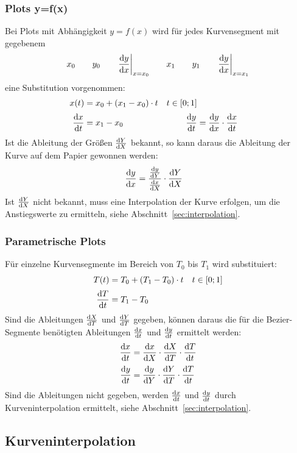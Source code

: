 \documentclass[ngerman,origlongtable]{scrartcl}
\begin{document}
\subsubsection{Plots y=f(x)}
Bei Plots mit Abhängigkeit \(y=f(x)\) wird für jedes Kurvensegment
mit gegebenem
\[
x_0\qquad{}y_0\qquad{\left.\frac{\mathrm{d}y}{\mathrm{d}x}\right|}_{x=x_0}\qquad{}x_1\qquad{}y_1\qquad{\left.\frac{\mathrm{d}y}{\mathrm{d}x}\right|}_{x=x_1}
\]
eine Substitution vorgenommen:
\begin{align*}
x(t)&=x_0+(x_1-x_0)\cdot t&t\in[0;1]\\[0.2em]
\frac{\mathrm{d} x}{\mathrm{d} t}&=x_1-x_0&\frac{\mathrm{d} y}{\mathrm{d} t}&=\frac{\mathrm{d} y}{\mathrm{d} x}\cdot\frac{\mathrm{d} x}{\mathrm{d} t}
\end{align*}
Ist die Ableitung der Größen \(\tfrac{\mathrm{d} Y}{\mathrm{d} X}\) bekannt, so kann
daraus die Ableitung der Kurve auf dem Papier gewonnen werden:
\begin{align*}
\frac{\mathrm{d} y}{\mathrm{d} x}&=\frac{\frac{\mathrm{d} y}{\mathrm{d} Y}}{\frac{\mathrm{d} x}{\mathrm{d} X}}\cdot\frac{\mathrm{d} Y}{\mathrm{d} X}
\end{align*}
Ist \(\tfrac{\mathrm{d} Y}{\mathrm{d} X}\) nicht bekannt, muss eine Interpolation der
Kurve erfolgen, um die Anstiegswerte zu ermitteln,
siehe Abschnitt~\vref{sec:interpolation}.
\clearpage
\subsubsection{Parametrische Plots}
Für einzelne Kurvensegmente im Bereich von \(T_0\) bis \(T_1\) wird
substituiert:
\begin{align*}
T(t)&=T_0+(T_1-T_0)\cdot t&t&\in[0;1]\\[0.2em]
\frac{\mathrm{d} T}{\mathrm{d} t}&=T_1-T_0\end{align*}
Sind die Ableitungen \(\tfrac{\mathrm{d} X}{\mathrm{d} T}\) und
\(\tfrac{\mathrm{d} Y}{\mathrm{d} T}\) gegeben, können daraus die für die Bezier-Segmente
benötigten Ableitungen \(\tfrac{\mathrm{d} x}{\mathrm{d} t}\)
und \(\tfrac{\mathrm{d} y}{\mathrm{d} t}\) ermittelt werden:
\begin{align*}
\frac{\mathrm{d} x}{\mathrm{d} t}&=\frac{\mathrm{d} x}{\mathrm{d} X}\cdot\frac{\mathrm{d} X}{\mathrm{d} T}\cdot\frac{\mathrm{d} T}{\mathrm{d} t}\\[0.2em]
\frac{\mathrm{d} y}{\mathrm{d} t}&=\frac{\mathrm{d} y}{\mathrm{d} Y}\cdot\frac{\mathrm{d} Y}{\mathrm{d} T}\cdot\frac{\mathrm{d} T}{\mathrm{d} t}
\end{align*}
Sind die Ableitungen nicht gegeben, werden \(\tfrac{\mathrm{d} x}{\mathrm{d} t}\) und
\(\tfrac{\mathrm{d} y}{\mathrm{d} t}\) durch Kurveninterpolation ermittelt,
siehe Abschnitt~\vref{sec:interpolation}.
\clearpage
\subsection{Kurveninterpolation}\label{sec:interpolation}
\end{document}
